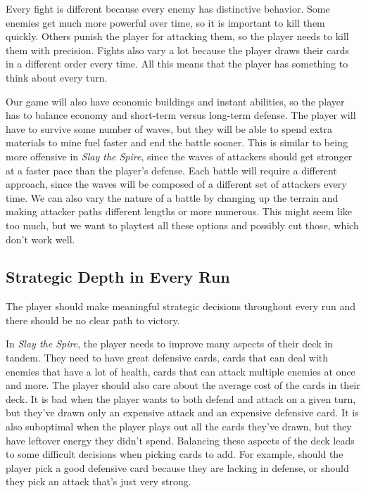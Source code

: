 Every fight is different because every enemy has distinctive behavior.
Some enemies get much more powerful over time, so it is important to kill them quickly.
Others punish the player for attacking them, so the player needs to kill them with precision.
Fights also vary a lot because the player draws their cards in a different order every time.
All this means that the player has something to think about every turn.

Our game will also have economic buildings and instant abilities, so the player has to balance economy and short-term versus long-term defense.
The player will have to survive some number of waves, but they will be able to spend extra materials to mine fuel faster and end the battle sooner.
This is similar to being more offensive in \emph{Slay the Spire}, since the waves of attackers should get stronger at a faster pace than the player's defense.
Each battle will require a different approach, since the waves will be composed of a different set of attackers every time.
We can also vary the nature of a battle by changing up the terrain and making attacker paths different lengths or more numerous.
This might seem like too much, but we want to playtest all these options and possibly cut those, which don't work well.

\subsection{Strategic Depth in Every Run} \label{sec:goal-depth-run}

The player should make meaningful strategic decisions throughout every run and there should be no clear path to victory.

In \emph{Slay the Spire}, the player needs to improve many aspects of their deck in tandem.
They need to have great defensive cards, cards that can deal with enemies that have a lot of health, cards that can attack multiple enemies at once and more.
The player should also care about the average cost of the cards in their deck.
It is bad when the player wants to both defend and attack on a given turn, but they've drawn only an expensive attack and an expensive defensive card.
It is also suboptimal when the player plays out all the cards they've drawn, but they have leftover energy they didn't spend.
Balancing these aspects of the deck leads to some difficult decisions when picking cards to add.
For example, should the player pick a good defensive card because they are lacking in defense, or should they pick an attack that's just very strong.

